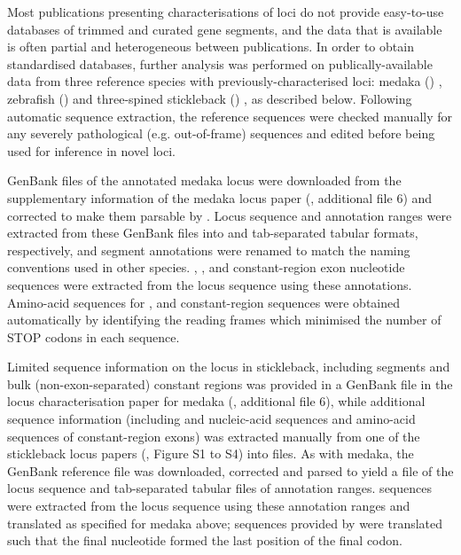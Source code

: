 
Most publications presenting characterisations of \igh{} loci do not provide easy-to-use databases of trimmed and curated gene segments, and the data that is available is often partial and heterogeneous between publications. In order to obtain standardised databases, further analysis was performed on publically-available data from three reference species with previously-characterised \igh{} loci: medaka () \parencite{magadan2011medaka}, zebrafish () \parencite{danilova2005zebrafish} and three-spined stickleback () \parencite{bao2010stickleback,gambondeza2011stickleback}, as described below. Following automatic sequence extraction, the reference sequences were checked manually for any severely pathological (e.g. out-of-frame) sequences and edited before being used for inference in novel loci.


GenBank files of the annotated medaka \igh{} locus were downloaded from the supplementary information of the medaka locus paper (\parencite{magadan2011medaka}, additional file 6) and corrected to make them parsable by . Locus sequence and annotation ranges were extracted from these GenBank files into  and tab-separated tabular formats, respectively, and segment annotations were renamed to match the naming conventions used in other species. \vh, \dh, \jh and constant-region exon nucleotide sequences were extracted from the locus sequence using these annotations. Amino-acid sequences for \vh, \jh and constant-region sequences were obtained automatically by identifying the reading frames which minimised the number of STOP codons in each sequence.


Limited sequence information on the \igh{} locus in stickleback, including \vh segments and bulk (non-exon-separated) constant regions was provided in a GenBank file in the locus characterisation paper for medaka (\parencite{magadan2011medaka}, additional file 6), while additional sequence information (including \dh and \jh nucleic-acid sequences and amino-acid sequences of constant-region exons) was extracted manually from one of the stickleback locus papers (\parencite{bao2010stickleback},  Figure S1 to S4) into  files. As with medaka, the GenBank reference file was downloaded, corrected and parsed to yield a  file of the locus sequence and tab-separated tabular files of annotation ranges. \vh sequences were extracted from the locus sequence using these annotation ranges and translated as specified for medaka above; \jh sequences provided by \parencite{bao2010stickleback} were translated such that the final nucleotide formed the last position of the final codon.

